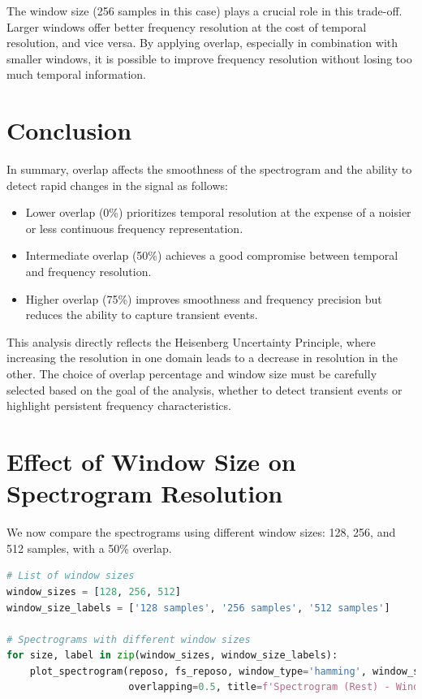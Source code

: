 \documentclass[10pt]{article}
\theoremstyle{definition}
\theoremstyle{remark}
\theoremstyle{definition}
\numberwithin{equation}{prob}
\begin{document}
The window size (256 samples in this case) plays a crucial role in this trade-off. Larger windows offer better frequency resolution at the cost of temporal resolution, and vice versa. By applying overlap, especially in combination with smaller windows, it is possible to improve frequency resolution without losing too much temporal information.

\section*{Conclusion}

In summary, overlap affects the smoothness of the spectrogram and the ability to detect rapid changes in the signal as follows:
\begin{itemize}
    \item Lower overlap (0\%) prioritizes temporal resolution at the expense of a noisier or less continuous frequency representation.
    \item Intermediate overlap (50\%) achieves a good compromise between temporal and frequency resolution.
    \item Higher overlap (75\%) improves smoothness and frequency precision but reduces the ability to capture transient events.
\end{itemize}

This analysis directly reflects the Heisenberg Uncertainty Principle, where increasing the resolution in one domain leads to a decrease in resolution in the other. The choice of overlap percentage and window size must be carefully selected based on the goal of the analysis, whether to detect transient events or highlight persistent frequency characteristics.






\section{Effect of Window Size on Spectrogram Resolution}

We now compare the spectrograms using different window sizes: 128, 256, and 512 samples, with a 50\% overlap.

\begin{lstlisting}[language=Python]
# List of window sizes
window_sizes = [128, 256, 512]
window_size_labels = ['128 samples', '256 samples', '512 samples']

# Spectrograms with different window sizes
for size, label in zip(window_sizes, window_size_labels):
    plot_spectrogram(reposo, fs_reposo, window_type='hamming', window_size=size,
                     overlapping=0.5, title=f'Spectrogram (Rest) - Window Size {label}')
\end{lstlisting}
\end{document}
